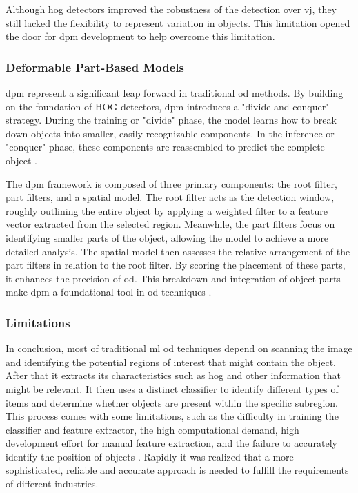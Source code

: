 Although \gls{hog} detectors improved the robustness of the detection over \gls{vj}, they still lacked the flexibility to represent variation in objects. This limitation opened the door for \gls{dpm} development to help overcome this limitation.

\subsubsection{Deformable Part-Based Models}
\gls{dpm} represent a significant leap forward in traditional \gls{od} methods. By building on the foundation of HOG detectors, \gls{dpm} introduces a "divide-and-conquer" strategy. During the training or "divide" phase, the model learns how to break down objects into smaller, easily recognizable components. In the inference or "conquer" phase, these components are reassembled to predict the complete object \cite{oD_Review}.

The \gls{dpm} framework is composed of three primary components: the root filter, part filters, and a spatial model. The root filter acts as the detection window, roughly outlining the entire object by applying a weighted filter to a feature vector extracted from the selected region. Meanwhile, the part filters focus on identifying smaller parts of the object, allowing the model to achieve a more detailed analysis. The spatial model then assesses the relative arrangement of the part filters in relation to the root filter. By scoring the placement of these parts, it enhances the precision of \gls{od}. This breakdown and integration of object parts make \gls{dpm} a foundational tool in \gls{od} techniques \cite{oD_Review}.

\subsubsection{Limitations}
In conclusion, most of traditional \gls{ml} \gls{od} techniques depend on scanning the image and identifying the potential regions of interest that might contain the object. After that it extracts its characteristics such as \gls{hog} and other information that might be relevant. It then uses a distinct classifier to identify different types of items and determine whether objects are present within the specific subregion. This process comes with some limitations, such as the difficulty in training the classifier and feature extractor, the high computational demand, high development effort for manual feature extraction, and the failure to accurately identify the position of objects \cite{OD_Survey}. Rapidly it was realized that a more sophisticated, reliable and accurate approach is needed to fulfill the requirements of different industries.


